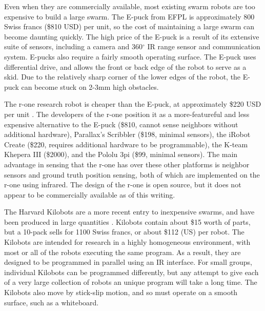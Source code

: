 Even when they are commercially available, most existing swarm robots are too expensive to build a large swarm.
The E-puck from EFPL is approximately 800 Swiss francs (\$810 USD) per unit, so the cost of maintaining a large swarm can become daunting quickly. 
The high price of the E-puck is a result of its extensive suite of sensors, including a camera and 360$^{\circ}$ IR range sensor and communication system. 
E-pucks also require a fairly smooth operating surface.
The E-puck uses differential drive, and allows the front or back edge of the robot to serve as a skid. 
Due to the relatively sharp corner of the lower edges of the robot, the E-puck can become stuck on 2-3mm high obstacles. 

The r-one research robot is cheaper than the E-puck, at approximately \$220 USD per unit \citep{mclurkin2013low}. 
The developers of the r-one position it as a more-featureful and less expensive alternative to the E-puck (\$810, cannot sense neighbors without additional hardware), Parallax's Scribbler (\$198, minimal sensors), the iRobot Create (\$220, requires additional hardware to be programmable), the K-team Khepera III (\$2000), and the Pololu 3pi (\$99, minimal sensors). 
The main advantage in sensing that the r-one has over these other platforms is neighbor sensors and ground truth position sensing, both of which are implemented on the r-one using infrared.
The design of the r-one is open source, but it does not appear to be commercially available as of this writing.   

The Harvard Kilobots are a more recent entry to inexpensive swarms, and have been produced in large quantities \citep{rubenstein2014kilobot}. 
Kilobots contain about \$15 worth of parts, but a 10-pack sells for 1100 Swiss francs, or about \$112 (US) per robot. 
The Kilobots are intended for research in a highly homogeneous environment, with most or all of the robots executing the same program. 
As a result, they are designed to be programmed in parallel using an IR interface. 
For small groups, individual Kilobots can be programmed differently, but any attempt to give each of a very large collection of robots an unique program will take a long time. 
The Kilobots also move by stick-slip motion, and so must operate on a smooth surface, such as a whiteboard. 

